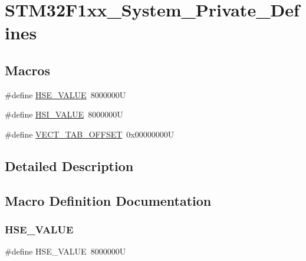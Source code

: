 \hypertarget{group__STM32F1xx__System__Private__Defines}{}\section{S\+T\+M32\+F1xx\+\_\+\+System\+\_\+\+Private\+\_\+\+Defines}
\label{group__STM32F1xx__System__Private__Defines}
\subsection*{Macros}
\begin{DoxyCompactItemize}
\item 
\#define \mbox{\hyperlink{group__STM32F1xx__System__Private__Defines_gaeafcff4f57440c60e64812dddd13e7cb}{H\+S\+E\+\_\+\+V\+A\+L\+UE}}~8000000U
\item 
\#define \mbox{\hyperlink{group__STM32F1xx__System__Private__Defines_gaaa8c76e274d0f6dd2cefb5d0b17fbc37}{H\+S\+I\+\_\+\+V\+A\+L\+UE}}~8000000U
\item 
\#define \mbox{\hyperlink{group__STM32F1xx__System__Private__Defines_ga40e1495541cbb4acbe3f1819bd87a9fe}{V\+E\+C\+T\+\_\+\+T\+A\+B\+\_\+\+O\+F\+F\+S\+ET}}~0x00000000U
\end{DoxyCompactItemize}


\subsection{Detailed Description}


\subsection{Macro Definition Documentation}
\mbox{\label{group__STM32F1xx__System__Private__Defines_gaeafcff4f57440c60e64812dddd13e7cb}} 
\subsubsection{\texorpdfstring{H\+S\+E\+\_\+\+V\+A\+L\+UE}{HSE\_VALUE}}
{\footnotesize\ttfamily \#define H\+S\+E\+\_\+\+V\+A\+L\+UE~8000000U}

